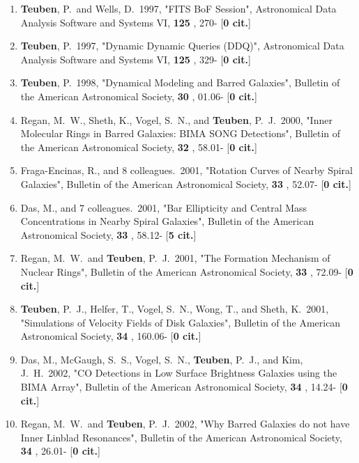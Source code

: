 \documentclass[11pt,letterpaper]{article}
\begin{document}
\begin{enumerate}[resume,label=\textbf{\arabic*}.]
\item  
{\bf Teuben}, P.~and Wells, D.\  1997,  "FITS BoF Session", Astronomical Data 
Analysis Software and Systems VI,  {\bf 125} , 270- [{\bf 0 cit.}] 

\item  
{\bf Teuben}, P.\  1997,  "Dynamic Dynamic Queries (DDQ)", Astronomical Data 
Analysis Software and Systems VI,  {\bf 125} , 329- [{\bf 0 cit.}]

\item  
{\bf Teuben}, P.\  1998,  "Dynamical Modeling and Barred Galaxies", Bulletin of 
the American Astronomical Society,  {\bf 30} , 01.06- [{\bf 0 cit.}]

\item  
Regan, M.~W., Sheth, K., Vogel, S.~N., and {\bf Teuben}, P.~J.\  2000,  "Inner 
Molecular Rings in Barred Galaxies: BIMA SONG Detections", Bulletin of the 
American Astronomical Society,  {\bf 32} , 58.01- [{\bf 0 cit.}] 

\item  
Fraga-Encinas, R., and 8 colleagues.\  2001,  "Rotation Curves of Nearby 
Spiral Galaxies", Bulletin of the American Astronomical Society,  {\bf 33} 
, 52.07- [{\bf 0 cit.}] 

\item  
Das, M., and 7 colleagues.\  2001,  "Bar Ellipticity and Central Mass 
Concentrations in Nearby Spiral Galaxies", Bulletin of the American 
Astronomical Society,  {\bf 33} , 58.12- [{\bf 5 cit.}] 

\item  
Regan, M.~W.~and {\bf Teuben}, P.~J.\  2001,  "The Formation Mechanism of 
Nuclear Rings", Bulletin of the American Astronomical Society,  {\bf 33} , 
72.09- [{\bf 0 cit.}] 
\item  
{\bf Teuben}, P.~J., Helfer, T., Vogel, S.~N., Wong, T., and Sheth, K.\  2001,  
"Simulations of Velocity Fields of Disk Galaxies", Bulletin of the American 
Astronomical Society,  {\bf 34} , 160.06- [{\bf 0 cit.}] 
\item  
Das, M., McGaugh, S.~S., Vogel, S.~N., {\bf Teuben}, P.~J., and Kim, J.~H.\  
2002,  "CO Detections in Low Surface Brightness Galaxies using the BIMA 
Array", Bulletin of the American Astronomical Society,  {\bf 34} , 14.24- 
[{\bf 0 cit.}] 

\item  
Regan, M.~W.~and {\bf Teuben}, P.~J.\  2002,  "Why Barred Galaxies do not have 
Inner Linblad Resonances", Bulletin of the American Astronomical Society,  
{\bf 34} , 26.01- [{\bf 0 cit.}] 


\end{enumerate}
\end{document}
